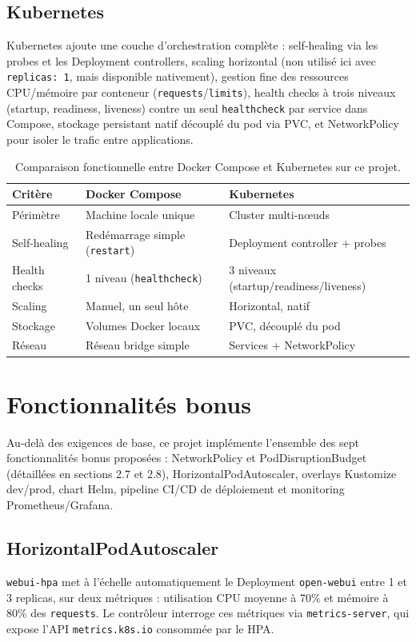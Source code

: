 \documentclass[11pt,a4paper]{article}
\begin{document}
\subsection{Kubernetes}
Kubernetes ajoute une couche d'orchestration complète : self-healing via les probes et les Deployment controllers, scaling horizontal (non utilisé ici avec \texttt{replicas: 1}, mais disponible nativement), gestion fine des ressources CPU/mémoire par conteneur (\texttt{requests}/\texttt{limits}), health checks à trois niveaux (startup, readiness, liveness) contre un seul \texttt{healthcheck} par service dans Compose, stockage persistant natif découplé du pod via PVC, et NetworkPolicy pour isoler le trafic entre applications.

\begin{table}[htbp]
\centering
\small
\begin{tabular}{@{}lll@{}}
\toprule
\textbf{Critère} & \textbf{Docker Compose} & \textbf{Kubernetes} \\
\midrule
Périmètre & Machine locale unique & Cluster multi-nœuds \\
Self-healing & Redémarrage simple (\texttt{restart}) & Deployment controller + probes \\
Health checks & 1 niveau (\texttt{healthcheck}) & 3 niveaux (startup/readiness/liveness) \\
Scaling & Manuel, un seul hôte & Horizontal, natif \\
Stockage & Volumes Docker locaux & PVC, découplé du pod \\
Réseau & Réseau bridge simple & Services + NetworkPolicy \\
\bottomrule
\end{tabular}
\caption{Comparaison fonctionnelle entre Docker Compose et Kubernetes sur ce projet.}
\end{table}

\section{Fonctionnalités bonus}

Au-delà des exigences de base, ce projet implémente l'ensemble des sept fonctionnalités bonus proposées : NetworkPolicy et PodDisruptionBudget (détaillées en sections 2.7 et 2.8), HorizontalPodAutoscaler, overlays Kustomize dev/prod, chart Helm, pipeline CI/CD de déploiement et monitoring Prometheus/Grafana.

\subsection{HorizontalPodAutoscaler}
\texttt{webui-hpa} met à l'échelle automatiquement le Deployment \texttt{open-webui} entre 1 et 3 replicas, sur deux métriques : utilisation CPU moyenne à 70\% et mémoire à 80\% des \texttt{requests}. Le contrôleur interroge ces métriques via \texttt{metrics-server}, qui expose l'API \texttt{metrics.k8s.io} consommée par le HPA.
\end{document}
